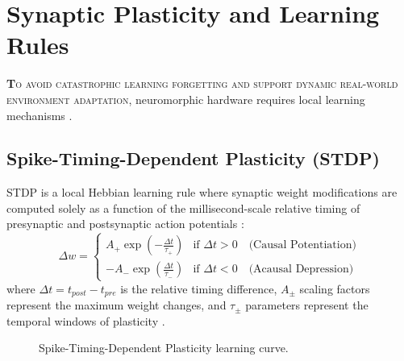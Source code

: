 \documentclass[11pt]{article}
\newcommand{\sectionlead}[2]{\noindent\lettrine[lines=2,lhang=0.08,nindent=0.12em]{\textcolor{IEEEblue}{\bfseries #1}}{\hspace{0.03em}#2}}
\begin{document}
\section{Synaptic Plasticity and Learning Rules}
\sectionlead{T}{o avoid catastrophic learning forgetting and support dynamic real-world environment adaptation}, neuromorphic hardware requires local learning mechanisms \cite{schuman2017survey,mead1990neuromorphic}.

\subsection{Spike-Timing-Dependent Plasticity (STDP)}
STDP is a local Hebbian learning rule where synaptic weight modifications are computed solely as a function of the millisecond-scale relative timing of presynaptic and postsynaptic action potentials \cite{schuman2017survey,mead1990neuromorphic,kudithipudi2025scale}:
$$\Delta w = \begin{cases} A_+ \exp\left(-\frac{\Delta t}{\tau_+}\right) & \text{if } \Delta t > 0 \quad \text{(Causal Potentiation)} \\ -A_- \exp\left(\frac{\Delta t}{\tau_-}\right) & \text{if } \Delta t < 0 \quad \text{(Acausal Depression)} \end{cases}$$
where $\Delta t = t_{post} - t_{pre}$ is the relative timing difference, $A_{\pm}$ scaling factors represent the maximum weight changes, and $\tau_{\pm}$ parameters represent the temporal windows of plasticity \cite{schuman2017survey,mead1990neuromorphic}. 


\begin{figure}[htbp]
    \centering
    \caption{Spike-Timing-Dependent Plasticity learning curve.}
    \label{fig:stdp_curve}
\end{figure}
\end{document}

